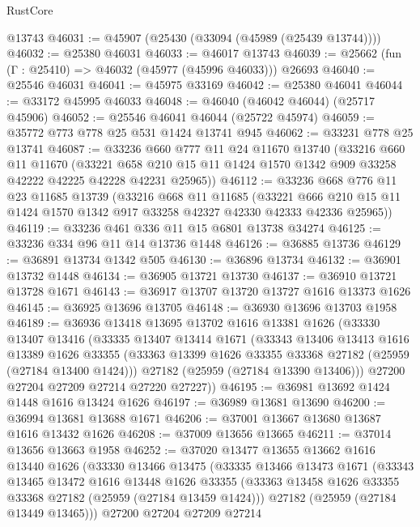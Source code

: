 \begin{lexlean}{RustCore}
\begin{coremodule}
    @13743
@46031 := @45907 (@25430 (@33094 (@45989 (@25439 @13744))))
@46032 := @25380 @46031
@46033 := @46017 @13743
@46039 := @25662 (fun (Γ : @25410) => @46032 (@45977 (@45996 @46033))) @26693
@46040 := @25546 @46031
@46041 := @45975 @33169
@46042 := @25380 @46041
@46044 := @33172 @45995 @46033
@46048 := @46040 (@46042 @46044) (@25717 @45906)
@46052 := @25546 @46041 @46044 (@25722 @45974)
@46059 := @35772 @773 @778 @25 @531 @1424 @13741 @945
@46062 := @33231 @778 @25 @13741
@46087 := @33236
    @660
    @777
    @11
    @24
    @11670
    @13740
    (@33216
      @660
      @11
      @11670
      (@33221 @658 @210 @15 @11 @1424 @1570 @1342 @909 @33258 @42222 @42225 @42228 @42231 @25965))
@46112 := @33236
    @668
    @776
    @11
    @23
    @11685
    @13739
    (@33216
      @668
      @11
      @11685
      (@33221 @666 @210 @15 @11 @1424 @1570 @1342 @917 @33258 @42327 @42330 @42333 @42336 @25965))
@46119 := @33236 @461 @336 @11 @15 @6801 @13738 @34274
@46125 := @33236 @334 @96 @11 @14 @13736 @1448
@46126 := @36885 @13736
@46129 := @36891 @13734 @1342 @505
@46130 := @36896 @13734
@46132 := @36901 @13732 @1448
@46134 := @36905 @13721 @13730
@46137 := @36910 @13721 @13728 @1671
@46143 := @36917 @13707 @13720 @13727 @1616 @13373 @1626
@46145 := @36925 @13696 @13705
@46148 := @36930 @13696 @13703 @1958
@46189 := @36936
    @13418
    @13695
    @13702
    @1616
    @13381
    @1626
    (@33330
      @13407
      @13416
      (@33335
        @13407
        @13414
        @1671
        (@33343
          @13406
          @13413
          @1616
          @13389
          @1626
          @33355
          (@33363 @13399 @1626 @33355 @33368 @27182 (@25959 (@27184 @13400 @1424)))
          @27182
          (@25959 (@27184 @13390 @13406)))
        @27200
        @27204
        @27209
        @27214
        @27220
        @27227))
@46195 := @36981 @13692 @1424 @1448 @1616 @13424 @1626
@46197 := @36989 @13681 @13690
@46200 := @36994 @13681 @13688 @1671
@46206 := @37001 @13667 @13680 @13687 @1616 @13432 @1626
@46208 := @37009 @13656 @13665
@46211 := @37014 @13656 @13663 @1958
@46252 := @37020
    @13477
    @13655
    @13662
    @1616
    @13440
    @1626
    (@33330
      @13466
      @13475
      (@33335
        @13466
        @13473
        @1671
        (@33343
          @13465
          @13472
          @1616
          @13448
          @1626
          @33355
          (@33363 @13458 @1626 @33355 @33368 @27182 (@25959 (@27184 @13459 @1424)))
          @27182
          (@25959 (@27184 @13449 @13465)))
        @27200
        @27204
        @27209
        @27214

\end{coremodule}
\end{lexlean}

